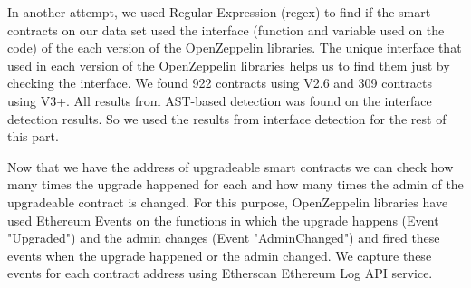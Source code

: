 In another attempt, we used Regular Expression (regex) to find if the smart contracts on our data set used the interface (function and variable used on the code) of the each version of the OpenZeppelin libraries. The unique interface that used in each version of the OpenZeppelin libraries helps us to find them just by checking the interface. We found 922 contracts using V2.6 and 309 contracts using V3+. All results from AST-based detection was found on the interface detection results. So we used the results from interface detection for the rest of this part.

Now that we have the address of upgradeable smart contracts we can check how many times the upgrade happened for each and how many times the admin of the upgradeable contract is changed. For this purpose, OpenZeppelin libraries have used Ethereum Events on the functions in which the upgrade happens (Event "Upgraded") and the admin changes (Event "AdminChanged") and fired these events when the upgrade happened or the admin changed. We capture these events for each contract address using Etherscan Ethereum Log API service.

